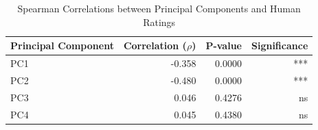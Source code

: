 \begin{table}[h!]
\centering
\caption{Spearman Correlations between Principal Components and Human Ratings}
\label{tab:correlations}
\begin{tabular}{lrrr}
\toprule
Principal Component & Correlation ($\rho$) & P-value & Significance \\
\midrule
PC1 & -0.358 & 0.0000 & *** \\
PC2 & -0.480 & 0.0000 & *** \\
PC3 & 0.046 & 0.4276 & ns \\
PC4 & 0.045 & 0.4380 & ns \\
\bottomrule
\end{tabular}
\end{table}

